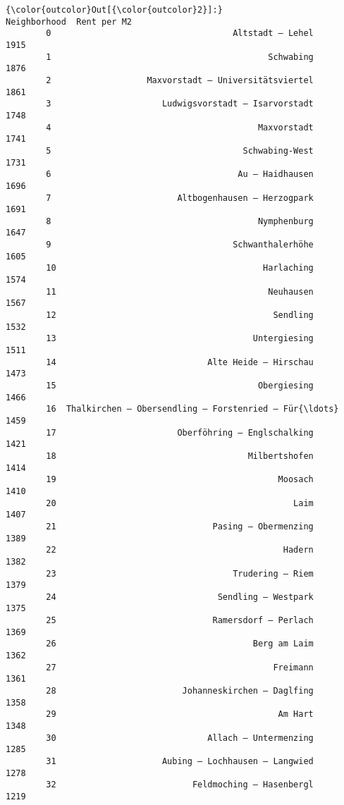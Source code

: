 \documentclass[11pt]{article}
\begin{document}
\begin{Verbatim}[commandchars=\\\{\}]
{\color{outcolor}Out[{\color{outcolor}2}]:}                                          Neighborhood  Rent per M2
        0                                    Altstadt – Lehel         1915
        1                                           Schwabing         1876
        2                   Maxvorstadt – Universitätsviertel         1861
        3                      Ludwigsvorstadt – Isarvorstadt         1748
        4                                         Maxvorstadt         1741
        5                                      Schwabing-West         1731
        6                                     Au – Haidhausen         1696
        7                         Altbogenhausen – Herzogpark         1691
        8                                         Nymphenburg         1647
        9                                    Schwanthalerhöhe         1605
        10                                         Harlaching         1574
        11                                          Neuhausen         1567
        12                                           Sendling         1532
        13                                       Untergiesing         1511
        14                              Alte Heide – Hirschau         1473
        15                                        Obergiesing         1466
        16  Thalkirchen – Obersendling – Forstenried – Für{\ldots}         1459
        17                        Oberföhring – Englschalking         1421
        18                                      Milbertshofen         1414
        19                                            Moosach         1410
        20                                               Laim         1407
        21                               Pasing – Obermenzing         1389
        22                                             Hadern         1382
        23                                   Trudering – Riem         1379
        24                                Sendling – Westpark         1375
        25                               Ramersdorf – Perlach         1369
        26                                       Berg am Laim         1362
        27                                           Freimann         1361
        28                         Johanneskirchen – Daglfing         1358
        29                                            Am Hart         1348
        30                              Allach – Untermenzing         1285
        31                     Aubing – Lochhausen – Langwied         1278
        32                           Feldmoching – Hasenbergl         1219
\end{Verbatim}
            
\end{document}
